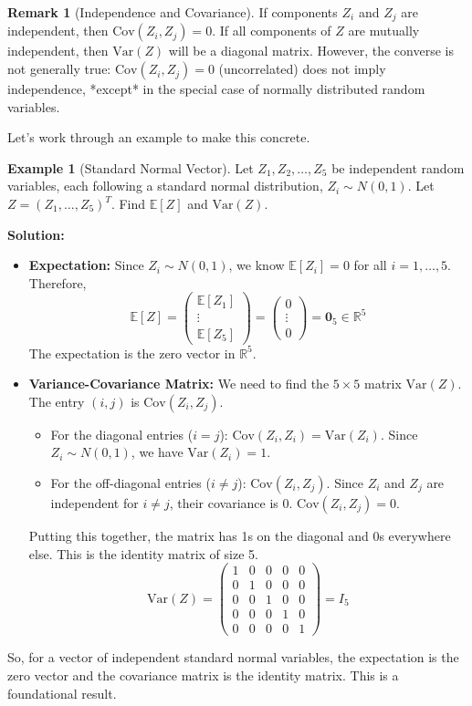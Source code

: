 \documentclass[11pt]{article}
\theoremstyle{definition}
\newtheorem{example}[theorem]{Example}
\newtheorem{remark}[theorem]{Remark}
\newcommand{\R}{\mathbb{R}} %
\newcommand{\E}{\mathbb{E}} %
\newcommand{\Var}{\mathrm{Var}} %
\newcommand{\Cov}{\mathrm{Cov}} %
\newcommand{\T}{^T} %
\newcommand{\bZero}{\mathbf{0}} %
\begin{document}
\begin{remark}[Independence and Covariance]
\label{rem:indep_cov}
If components $Z_i$ and $Z_j$ are independent, then $\Cov(Z_i, Z_j) = 0$. If all components of $Z$ are mutually independent, then $\Var(Z)$ will be a diagonal matrix. However, the converse is not generally true: $\Cov(Z_i, Z_j) = 0$ (uncorrelated) does not imply independence, *except* in the special case of normally distributed random variables.
\end{remark}

Let's work through an example to make this concrete.

\begin{example}[Standard Normal Vector]
\label{ex:std_normal_vector}
Let $Z_1, Z_2, \ldots, Z_5$ be independent random variables, each following a standard normal distribution, $Z_i \sim N(0, 1)$. Let $Z = (Z_1, \ldots, Z_5)\T$. Find $\E[Z]$ and $\Var(Z)$.

\textbf{Solution:}
\begin{itemize}
    \item \textbf{Expectation:} Since $Z_i \sim N(0, 1)$, we know $\E[Z_i] = 0$ for all $i=1, \ldots, 5$. Therefore,
    \[
    \E[Z] = \begin{pmatrix} \E[Z_1] \\ \vdots \\ \E[Z_5] \end{pmatrix} = \begin{pmatrix} 0 \\ \vdots \\ 0 \end{pmatrix} = \bZero_5 \in \R^5
    \]
    The expectation is the zero vector in $\R^5$.

    \item \textbf{Variance-Covariance Matrix:} We need to find the $5 \times 5$ matrix $\Var(Z)$. The entry $(i, j)$ is $\Cov(Z_i, Z_j)$.
        \begin{itemize}
            \item For the diagonal entries ($i = j$): $\Cov(Z_i, Z_i) = \Var(Z_i)$. Since $Z_i \sim N(0, 1)$, we have $\Var(Z_i) = 1$.
            \item For the off-diagonal entries ($i \neq j$): $\Cov(Z_i, Z_j)$. Since $Z_i$ and $Z_j$ are independent for $i \neq j$, their covariance is 0. $\Cov(Z_i, Z_j) = 0$.
        \end{itemize}
    Putting this together, the matrix has 1s on the diagonal and 0s everywhere else. This is the identity matrix of size 5.
    \[
    \Var(Z) = \begin{pmatrix}
    1 & 0 & 0 & 0 & 0 \\
    0 & 1 & 0 & 0 & 0 \\
    0 & 0 & 1 & 0 & 0 \\
    0 & 0 & 0 & 1 & 0 \\
    0 & 0 & 0 & 0 & 1
    \end{pmatrix} = I_5
    \]
\end{itemize}
So, for a vector of independent standard normal variables, the expectation is the zero vector and the covariance matrix is the identity matrix. This is a foundational result.
\end{example}
\end{document}
